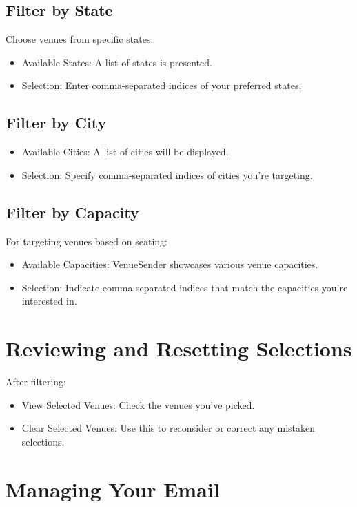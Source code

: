 \documentclass{article}
\begin{document}
	\subsection*{Filter by State}
	Choose venues from specific states:
	\begin{itemize}
		\item Available States: A list of states is presented.
		\item Selection: Enter comma-separated indices of your preferred states.
	\end{itemize}
	
	\subsection*{Filter by City}
	\begin{itemize}
		\item Available Cities: A list of cities will be displayed.
		\item Selection: Specify comma-separated indices of cities you're targeting.
	\end{itemize}
	
	\subsection*{Filter by Capacity}
	For targeting venues based on seating:
	\begin{itemize}
		\item Available Capacities: VenueSender showcases various venue capacities.
		\item Selection: Indicate comma-separated indices that match the capacities you're interested in.
	\end{itemize}
	
	\section*{Reviewing and Resetting Selections}
	After filtering:
	\begin{itemize}
		\item View Selected Venues: Check the venues you've picked.
		\item Clear Selected Venues: Use this to reconsider or correct any mistaken selections.
	\end{itemize}
	
	\section*{Managing Your Email}
\end{document}
